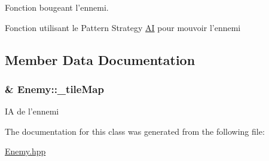 Fonction bougeant l'ennemi. 

Fonction utilisant le Pattern Strategy \hyperlink{class_a_i}{A\+I} pour mouvoir l'ennemi 

\subsection{Member Data Documentation}
\hypertarget{class_enemy_a25c3a0c770a6cf5ae9cd9e4d71968aff}{
\subsubsection[{\+\_\+tile\+Map}]{\& Enemy\+::\+\_\+tile\+Map\hspace{0.3cm}{\ttfamily [protected]}}}\label{class_enemy_a25c3a0c770a6cf5ae9cd9e4d71968aff}
I\+A de l'ennemi 

The documentation for this class was generated from the following file\+:\begin{DoxyCompactItemize}
\item 
\hyperlink{_enemy_8hpp}{Enemy.\+hpp}\end{DoxyCompactItemize}
